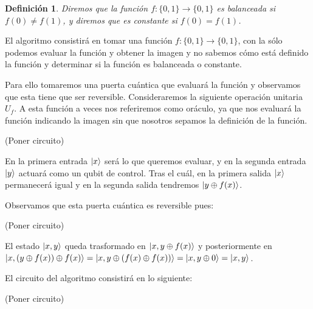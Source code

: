 \documentclass[a4paper]{article}
\newtheorem{deff}{Definición}[section]
\numberwithin{equation}{section}
\begin{document}
\begin{deff}
Diremos que la función $f:\{0, 1\} \rightarrow \{0, 1\}$ es balanceada si $f(0) \neq f(1)$, y diremos que es constante si $f(0) = f(1)$.
\end{deff}

El algoritmo consistirá en tomar una función $f:\{0, 1\} \rightarrow \{0, 1\}$, con la sólo podemos evaluar la función y obtener la imagen y no sabemos cómo está definido la función y determinar si la función es balanceada o constante.

Para ello tomaremos una puerta cuántica que evaluará la función y observamos que esta tiene que ser reversible. Consideraremos la siguiente operación unitaria $U_f$. A esta función a veces nos referiremos como oráculo, ya que nos evaluará la función indicando la imagen sin que nosotros sepamos la definición de la función.

(Poner circuito)

En la primera entrada $\ket{x}$ será lo que queremos evaluar, y en la segunda entrada $\ket{y}$ actuará como un qubit de control. Tras el cuál, en la primera salida $\ket{x}$ permanecerá igual y en la segunda salida tendremos $\ket{y\oplus f(x)}$.

Observamos que esta puerta cuántica es reversible pues:

(Poner circuito)

El estado $\ket{x, y}$ queda trasformado en $\ket{x, y\oplus f(x)}$ y posteriormente en $\ket{x, (y\oplus f(x))\oplus f(x)} = \ket{x, y\oplus (f(x)\oplus f(x))} = \ket{x, y\oplus 0} = \ket{x, y}$.

El circuito del algoritmo consistirá en lo siguiente:

(Poner circuito)
\end{document}
